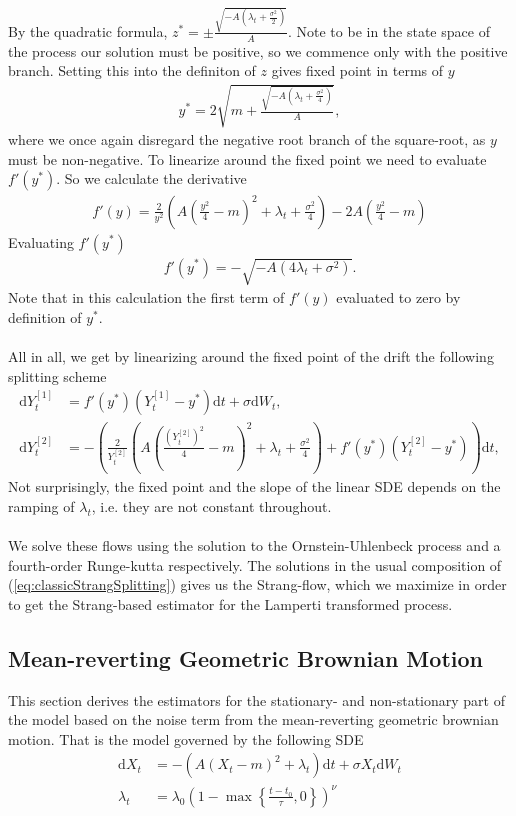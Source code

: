 By the quadratic formula, $z^* = \pm\frac{\sqrt{-A\left(\lambda_t + \frac{\sigma^2}{2}\right)}}{A}$. Note to be in the state space of the process our solution must be positive, so we commence only with the positive branch. Setting this into the definiton of $z$ gives fixed point in terms of $y$
\begin{align}
    y^* = 2\sqrt{m + \frac{\sqrt{-A\left(\lambda_t + \frac{\sigma^2}{4}\right)}}{A}},
\end{align}
where we once again disregard the negative root branch of the square-root, as $y$ must be non-negative. To linearize around the fixed point we need to evaluate $f'(y^*)$. So we calculate the derivative
\begin{align}
    f'(y) = \frac{2}{y^2}\left(A\left(\frac{y^2}{4}-m\right)^2 + \lambda_t + \frac{\sigma^2}{4}\right) - 2A\left(\frac{y^2}{4} - m\right)
\end{align}
Evaluating $f'(y^*)$
\begin{align}
    f'(y^*) = -\sqrt{-A\left(4\lambda_t + \sigma^2\right)}.
\end{align}
Note that in this calculation the first term of $f'(y)$ evaluated to zero by definition of $y^*$.\\\\
All in all, we get by linearizing around the fixed point of the drift the following splitting scheme
\begin{align}
    \mathrm{d}Y_t^{[1]} &= f'(y^*)\left(Y_t^{[1]} - y^*\right)\mathrm{d}t + \sigma \mathrm{d}W_t, \label{eq:lampertiSquarerootSplitting1}\\
    \mathrm{d}Y_t^{[2]} &= - \left(\frac{2}{Y_t^{[2]}}\left(A\left(\frac{\left(Y_t^{[2]}\right)^2}{4} - m\right)^2 + \lambda_t + \frac{\sigma^2}{4}\right) + f'(y^*)\left(Y_t^{[2]} - y^*\right)\right)\mathrm{d}t,
\end{align}
Not surprisingly, the fixed point and the slope of the linear SDE depends on the ramping of $\lambda_t$, i.e. they are not constant throughout. \\\\
We solve these flows using the solution to the Ornstein-Uhlenbeck process and a fourth-order Runge-kutta respectively. The solutions in the usual composition of (\ref{eq:classicStrangSplitting}) gives us the Strang-flow, which we maximize in order to get the Strang-based estimator for the Lamperti transformed process.
\newpage
\subsection{Mean-reverting Geometric Brownian Motion}\label{subsec:meanrevertingGBM}
This section derives the estimators for the stationary- and non-stationary part of the model based on the noise term from the mean-reverting geometric brownian motion. That is the model governed by the following SDE
\begin{align}
    \mathrm{d}X_t &= -\left(A\left(X_t - m\right)^2 + \lambda_t\right)\mathrm{d}t + \sigma X_t \mathrm{d}W_t\\
    \lambda_t &= \lambda_0\left(1 - \max\left\{\frac{t - t_0}{\tau}, 0\right\}\right)^\nu
\end{align}
